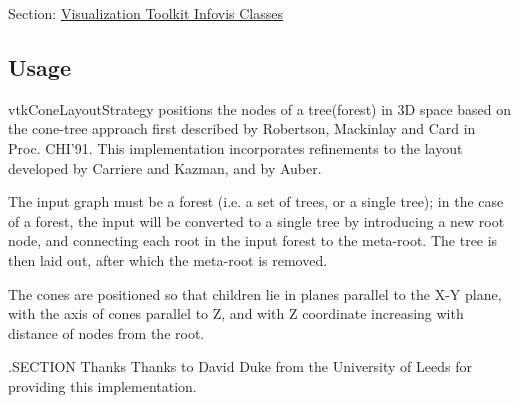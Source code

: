 Section\-: \hyperlink{sec_vtkinfovis}{Visualization Toolkit Infovis Classes} \hypertarget{vtkwidgets_vtkxyplotwidget_Usage}{}\subsection{Usage}\label{vtkwidgets_vtkxyplotwidget_Usage}
vtk\-Cone\-Layout\-Strategy positions the nodes of a tree(forest) in 3\-D space based on the cone-\/tree approach first described by Robertson, Mackinlay and Card in Proc. C\-H\-I'91. This implementation incorporates refinements to the layout developed by Carriere and Kazman, and by Auber.

The input graph must be a forest (i.\-e. a set of trees, or a single tree); in the case of a forest, the input will be converted to a single tree by introducing a new root node, and connecting each root in the input forest to the meta-\/root. The tree is then laid out, after which the meta-\/root is removed.

The cones are positioned so that children lie in planes parallel to the X-\/\-Y plane, with the axis of cones parallel to Z, and with Z coordinate increasing with distance of nodes from the root.

.S\-E\-C\-T\-I\-O\-N Thanks Thanks to David Duke from the University of Leeds for providing this implementation.

